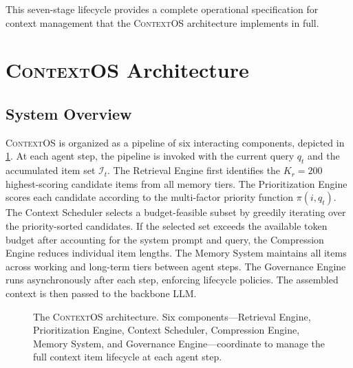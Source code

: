\documentclass[review,12pt]{elsarticle}
\newcommand{\contextos}{\textsc{ContextOS}}
\newcommand{\prio}{\pi}
\begin{document}
This seven-stage lifecycle provides a complete operational specification for
context management that the \contextos{} architecture implements in full.

\section{\contextos{} Architecture}
\label{sec:architecture}

\subsection{System Overview}
\label{subsec:overview}

\contextos{} is organized as a pipeline of six interacting components,
depicted in \cref{fig:architecture}.  At each agent step, the pipeline is
invoked with the current query $q_t$ and the accumulated item set
$\mathcal{I}_t$.  The Retrieval Engine first identifies the $K_r = 200$
highest-scoring candidate items from all memory tiers.  The Prioritization
Engine scores each candidate according to the multi-factor priority function
$\prio(i, q_t)$.  The Context Scheduler selects a budget-feasible subset by
greedily iterating over the priority-sorted candidates.  If the selected set
exceeds the available token budget after accounting for the system prompt and
query, the Compression Engine reduces individual item lengths.  The Memory
System maintains all items across working and long-term tiers between agent
steps.  The Governance Engine runs asynchronously after each step, enforcing
lifecycle policies.  The assembled context is then passed to the backbone LLM.

\begin{figure}[t]
  \centering
  \caption{The \contextos{} architecture.  Six components—Retrieval Engine,
    Prioritization Engine, Context Scheduler, Compression Engine,
    Memory System, and Governance Engine—coordinate to manage the full
    context item lifecycle at each agent step.}
  \label{fig:architecture}
\end{figure}
\end{document}
